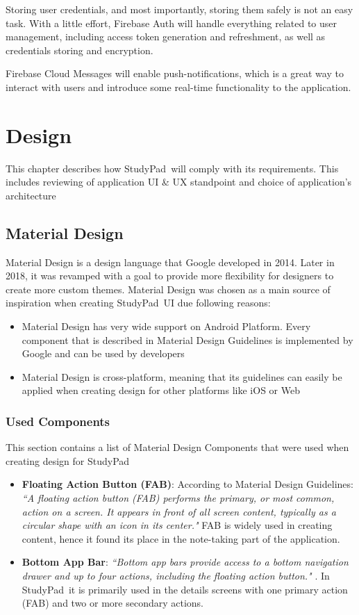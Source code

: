 \documentclass[thesis=B,english]{FITthesis}[2012/10/20]
\newcommand{\appname}{StudyPad}
\newcommand{\quoting}[1]{\textit{``#1"}}
\begin{document}
Storing user credentials, and most importantly, storing them safely is not an easy task. With a little effort, Firebase Auth will handle everything related to user management, including access token generation and refreshment, as well as credentials storing and encryption.

Firebase Cloud Messages will enable push-notifications, which is a great way to interact with users and introduce some real-time functionality to the application. 

	
\chapter{Design}

This chapter describes how \appname\ will comply with its requirements. This includes reviewing of application UI \& UX standpoint and choice of application's architecture

\section{Material Design}
Material Design is a design language that Google developed in 2014. Later in 2018, it was revamped with a goal to provide more flexibility for designers to create more custom themes. Material Design was chosen as a main source of inspiration when creating \appname\ UI due following  reasons:
\begin{itemize}
	\item Material Design has very wide support on Android Platform. Every component that is described in Material Design Guidelines is implemented by Google and can be used by developers
	\item Material Design is cross-platform, meaning that its guidelines can easily be applied when creating design for other platforms like iOS or Web
\end{itemize}

\subsection{Used Components}
This section contains a list of Material Design Components that were used when creating design for \appname

\begin{itemize}
	\item \textbf{Floating Action Button (FAB)}: According to Material Design Guidelines: \quoting{A floating action button (FAB) performs the primary, or most common, action on a screen. It appears in front of all screen content, typically as a circular shape with an icon in its center.} \cite{material-fab} FAB is widely used in creating content, hence it found its place in the note-taking part of the application.
	\item \textbf{Bottom App Bar}: \quoting{Bottom app bars provide access to a bottom navigation drawer and up to four actions, including the floating action button.} \cite{material-bottomappbar}. In \appname\ it is primarily used in the details screens with one primary action (FAB) and two or more secondary actions.
\end{itemize}
\end{document}
